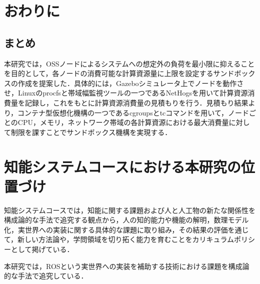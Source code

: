 \documentclass[11pt]{ujarticle} %
\begin{document}
\section{おわりに}
\subsection{まとめ}
本研究では，OSSノードによるシステムへの想定外の負荷を最小限に抑えることを目的として，各ノードの消費可能な計算資源量に上限を設定するサンドボックスの作成を提案した．具体的には，Gazeboシミュレータ上でノードを動作させ，Linuxのprocfsと帯域幅監視ツールの一つであるNetHogsを用いて計算資源消費量を記録し，これをもとに計算資源消費量の見積もりを行う．見積もり結果より，コンテナ型仮想化機構の一つであるcgroupsとtcコマンドを用いて，ノードごとのCPU，メモリ，ネットワーク帯域の各計算資源における最大消費量に対して制限を課すことでサンドボックス機構を実現する．

\section{知能システムコースにおける本研究の位置づけ}
知能システムコースでは，知能に関する課題および人と人工物の新たな関係性を構成論的な手法で追究する観点から，人の知的能力や機能の解明，数理モデル化，実世界への実装に関する具体的な課題に取り組み，その結果の評価を通じて，新しい方法論や，学問領域を切り拓く能力を育むことをカリキュラムポリシーとして掲げている．

本研究では，ROSという実世界への実装を補助する技術における課題を構成論的な手法で追究している．

\end{document}
